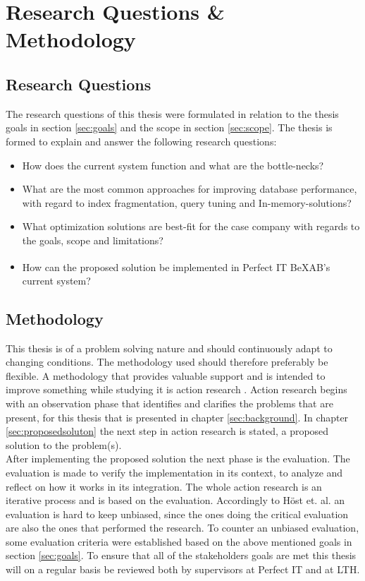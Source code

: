 \documentclass{cslthse-msc}
\newcommand{\bex}{BeX\textsuperscript{\textregistered}}
\begin{document}
\chapter{Research Questions \& Methodology}\label{chap:3}

\section{Research Questions}
The research questions of this thesis were formulated in relation to the thesis goals in section \ref{sec:goals} and the scope in section \ref{sec:scope}. The thesis is formed to explain and answer the following research questions:
\begin{itemize}
\item	How does the current system function and what are the bottle-necks?
\item 	What are the most common approaches for improving database performance, with regard to index fragmentation, query tuning and In-memory-solutions?
\item	What optimization solutions are best-fit for the case company with regards to the goals, scope and limitations?	
\item	How can the proposed solution be implemented in Perfect IT \bex AB's current system?
\end{itemize}

\section{Methodology}
This thesis is of a problem solving nature and should continuously adapt to changing conditions. The methodology used should therefore preferably be flexible. A methodology that provides valuable support and is intended to improve something while studying it is action research    \cite{robson}. Action research begins with an observation phase that identifies and clarifies the problems that are present, for this thesis that is presented in chapter \ref{sec:background}. In chapter \ref{sec:proposedsoluton} the next step in action research is stated, a proposed solution to the problem(s).\\

After implementing the proposed solution the next phase is the evaluation. The evaluation is made to verify the implementation in its context, to analyze and reflect on how it works in its integration. The whole action research is an iterative process and is based on the evaluation. Accordingly to Höst et. al.    \cite{regnell} an evaluation is hard to keep unbiased, since the ones doing the critical evaluation are also the ones that performed the research. To counter an unbiased evaluation, some evaluation criteria were established based on the above mentioned goals in section \ref{sec:goals}. To ensure that all of the stakeholders goals are met this thesis will on a regular basis be reviewed both by supervisors at Perfect IT and at LTH.
\end{document}
